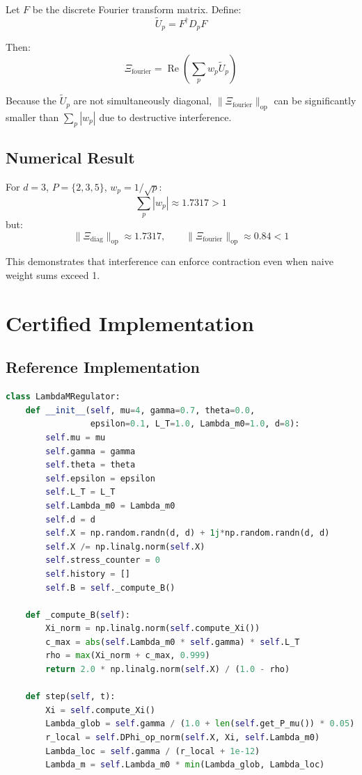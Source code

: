 \documentclass[11pt]{article}
\begin{document}
\begin{enumerate}
Let $F$ be the discrete Fourier transform matrix. Define:
\[
\tilde{U}_p = F^\dagger D_p F
\]

Then:
\[
\Xi_{\text{fourier}} = \operatorname{Re}\left(\sum_p w_p \tilde{U}_p\right)
\]

Because the $\tilde{U}_p$ are not simultaneously diagonal, $\|\Xi_{\text{fourier}}\|_{\mathrm{op}}$ can be significantly smaller than $\sum_p |w_p|$ due to destructive interference.

\subsection{Numerical Result}

For $d=3$, $P=\{2,3,5\}$, $w_p = 1/\sqrt{p}$:
\[
\sum_p |w_p| \approx 1.7317 > 1
\]
but:
\[
\|\Xi_{\text{diag}}\|_{\mathrm{op}} \approx 1.7317, \qquad
\|\Xi_{\text{fourier}}\|_{\mathrm{op}} \approx 0.84 < 1
\]

This demonstrates that interference can enforce contraction even when naive weight sums exceed 1.

\section{Certified Implementation}

\subsection{Reference Implementation}

\begin{lstlisting}[language=Python, caption=Governed $\Lambda_m$ Regulator]
class LambdaMRegulator:
    def __init__(self, mu=4, gamma=0.7, theta=0.0,
                 epsilon=0.1, L_T=1.0, Lambda_m0=1.0, d=8):
        self.mu = mu
        self.gamma = gamma
        self.theta = theta
        self.epsilon = epsilon
        self.L_T = L_T
        self.Lambda_m0 = Lambda_m0
        self.d = d
        self.X = np.random.randn(d, d) + 1j*np.random.randn(d, d)
        self.X /= np.linalg.norm(self.X)
        self.stress_counter = 0
        self.history = []
        self.B = self._compute_B()
    
    def _compute_B(self):
        Xi_norm = np.linalg.norm(self.compute_Xi())
        c_max = abs(self.Lambda_m0 * self.gamma) * self.L_T
        rho = max(Xi_norm + c_max, 0.999)
        return 2.0 * np.linalg.norm(self.X) / (1.0 - rho)
    
    def step(self, t):
        Xi = self.compute_Xi()
        Lambda_glob = self.gamma / (1.0 + len(self.get_P_mu()) * 0.05)
        r_local = self.DPhi_op_norm(self.X, Xi, self.Lambda_m0)
        Lambda_loc = self.gamma / (r_local + 1e-12)
        Lambda_m = self.Lambda_m0 * min(Lambda_glob, Lambda_loc)
        

\end{lstlisting}
\end{enumerate}
\end{document}

